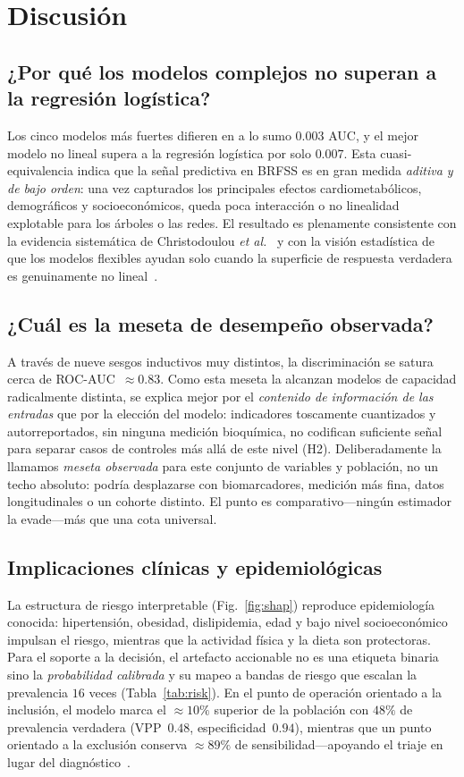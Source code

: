 \documentclass[conference]{IEEEtran}
\begin{document}
\section{Discusión}
\subsection{¿Por qué los modelos complejos no superan a la regresión logística?}
Los cinco modelos más fuertes difieren en a lo sumo $0.003$ AUC, y el mejor modelo no lineal
supera a la regresión logística por solo $0.007$. Esta cuasi-equivalencia indica que la
señal predictiva en BRFSS es en gran medida \emph{aditiva y de bajo orden}: una vez
capturados los principales efectos cardiometabólicos, demográficos y socioeconómicos, queda
poca interacción o no linealidad explotable para los árboles o las redes. El resultado es
plenamente consistente con la evidencia sistemática de Christodoulou \emph{et
al.}~\cite{christodoulou2019systematic} y con la visión estadística de que los modelos
flexibles ayudan solo cuando la superficie de respuesta verdadera es genuinamente no
lineal~\cite{steyerberg2019validation}.

\subsection{¿Cuál es la meseta de desempeño observada?}
A través de nueve sesgos inductivos muy distintos, la discriminación se satura cerca de
ROC-AUC~$\approx0.83$. Como esta meseta la alcanzan modelos de capacidad radicalmente
distinta, se explica mejor por el \emph{contenido de información de las entradas} que por la
elección del modelo: indicadores toscamente cuantizados y autorreportados, sin ninguna
medición bioquímica, no codifican suficiente señal para separar casos de controles más allá
de este nivel (H2). Deliberadamente la llamamos \emph{meseta observada} para este conjunto
de variables y población, no un techo absoluto: podría desplazarse con biomarcadores,
medición más fina, datos longitudinales o un cohorte distinto. El punto es
comparativo---ningún estimador la evade---más que una cota universal.

\subsection{Implicaciones clínicas y epidemiológicas}
La estructura de riesgo interpretable (Fig.~\ref{fig:shap}) reproduce epidemiología
conocida: hipertensión, obesidad, dislipidemia, edad y bajo nivel socioeconómico impulsan el
riesgo, mientras que la actividad física y la dieta son protectoras. Para el soporte a la
decisión, el artefacto accionable no es una etiqueta binaria sino la \emph{probabilidad
calibrada} y su mapeo a bandas de riesgo que escalan la prevalencia $16$ veces
(Tabla~\ref{tab:risk}). En el punto de operación orientado a la inclusión, el modelo marca
el $\approx10\%$ superior de la población con $48\%$ de prevalencia verdadera (VPP~$0.48$,
especificidad~$0.94$), mientras que un punto orientado a la exclusión conserva $\approx89\%$
de sensibilidad---apoyando el triaje en lugar del
diagnóstico~\cite{vancalster2019calibration}.
\end{document}
